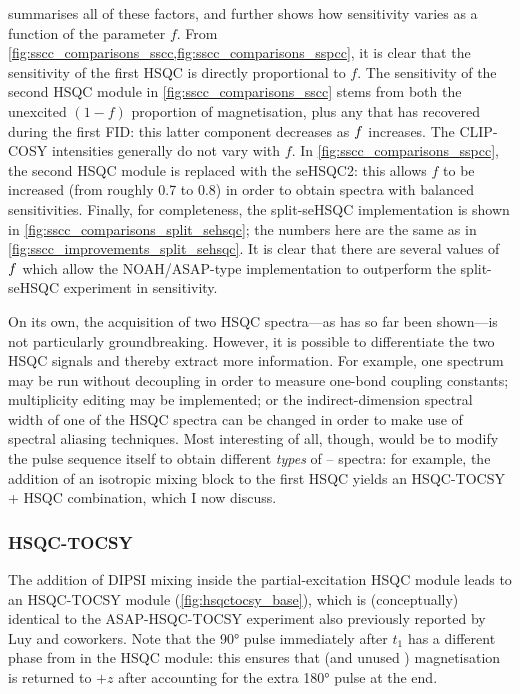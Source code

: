 summarises all of these factors, and further shows how sensitivity varies as a function of the parameter $f$.
From \cref{fig:sscc_comparisons_sscc,fig:sscc_comparisons_sspcc}, it is clear that the sensitivity of the first HSQC is directly proportional to $f$.
The sensitivity of the second HSQC module in \cref{fig:sscc_comparisons_sscc} stems from both the unexcited $(1 - f)$ proportion of  magnetisation, plus any that has recovered during the first FID: this latter component decreases as $f\/$ increases.
The CLIP-COSY intensities generally do not vary with $f$.
In \cref{fig:sscc_comparisons_sspcc}, the second HSQC module is replaced with the seHSQC2: this allows $f$ to be increased (from roughly 0.7 to 0.8) in order to obtain spectra with balanced sensitivities.
Finally, for completeness, the split-seHSQC implementation is shown in \cref{fig:sscc_comparisons_split_sehsqc}; the numbers here are the same as in \cref{fig:sscc_improvements_split_sehsqc}.
It is clear that there are several values of $f\/$ which allow the NOAH/ASAP-type implementation to outperform the split-seHSQC experiment in sensitivity.

On its own, the acquisition of two HSQC spectra---as has so far been shown---is not particularly groundbreaking.
However, it is possible to differentiate the two HSQC signals and thereby extract more information.
For example, one spectrum may be run without decoupling in order to measure one-bond coupling constants\autocite{Enthart2008JMR,Nolis2019CPC}; multiplicity editing may be implemented\autocite{SchulzeSunninghausen2017JMR}; or the indirect-dimension spectral width of one of the HSQC spectra can be changed in order to make use of spectral aliasing techniques\autocite{Nolis2019JMR,Jeannerat2011eMR}.
Most interesting of all, though, would be to modify the pulse sequence itself to obtain different \textit{types} of \proton{}--\carbon{} spectra: for example, the addition of an isotropic mixing block to the first HSQC yields an HSQC-TOCSY + HSQC combination\autocite{Nolis2019CPC}, which I now discuss.


\subsubsection{HSQC-TOCSY}

The addition of DIPSI mixing inside the partial-excitation HSQC module leads to an HSQC-TOCSY module (\cref{fig:hsqctocsy_base}), which is (conceptually) identical to the ASAP-HSQC-TOCSY experiment also previously reported by Luy and coworkers\autocite{Becker2019JMR}.
Note that the \proton{} \ang{90} pulse immediately after $t_1$ has a different phase from in the HSQC module: this ensures that  (and unused ) magnetisation is returned to $+z$ after accounting for the extra \ang{180} pulse at the end.

